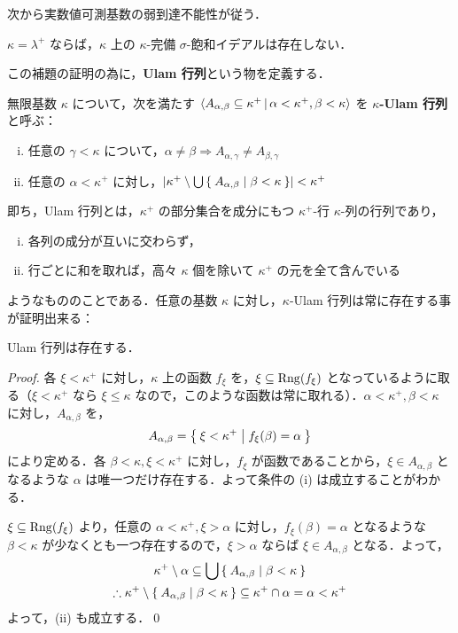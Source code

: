 \documentclass[a4j]{jsarticle}
\begin{document}
次から実数値可測基数の弱到達不能性が従う．

\begin{lemma}
 $\kappa = \lambda^+$ ならば，$\kappa$ 上の $\kappa$-完備 $\sigma$-飽和イデアルは存在しない．
\end{lemma}

この補題の証明の為に，{\bfseries Ulam 行列}という物を定義する．

\begin{definition}[Ulam 行列]
 無限基数 $\kappa$ について，次を満たす $\Braket{A_{\alpha, \beta} \subseteq \kappa^+ | \alpha < \kappa^+, \beta < \kappa }$ を {\bfseries $\kappa$-Ulam 行列} と呼ぶ：
 \begin{enumerate}[(i)]
 \item 任意の $\gamma < \kappa$ について，$\alpha \neq \beta \Rightarrow A_{\alpha,\gamma} \neq A_{\beta, \gamma}$
 \item 任意の $\alpha < \kappa^+$ に対し，$\left|\kappa^+ \setminus \bigcup\Set{A_{\alpha, \beta} | \beta < \kappa}\right| < \kappa^+$
 \end{enumerate}
\end{definition}

即ち，Ulam 行列とは，$\kappa^+$ の部分集合を成分にもつ $\kappa^+$-行 $\kappa$-列の行列であり，
\begin{enumerate}[(i)]
 \item 各列の成分が互いに交わらず，
 \item 行ごとに和を取れば，高々 $\kappa$ 個を除いて $\kappa^+$ の元を全て含んでいる
\end{enumerate}
ようなもののことである．任意の基数 $\kappa$ に対し，$\kappa$-Ulam 行列は常に存在する事が証明出来る：
\begin{lemma}\label{lem:Ulam-matrix-exists}
 Ulam 行列は存在する．
\end{lemma}
\begin{proof}
 各 $\xi < \kappa^+$ に対し，$\kappa$ 上の函数 $f_\xi$ を，$\xi \subseteq \mathrm{Rng}(f_\xi)$ となっているように取る（$\xi < \kappa^+$ なら $\xi \leq \kappa$ なので，このような函数は常に取れる）．$\alpha < \kappa^+, \beta < \kappa$ に対し，$A_{\alpha, \beta}$ を，
 \[
  A_{\alpha, \beta} = \Set{\xi < \kappa^+ | f_\xi(\beta) = \alpha }
 \]
 により定める．各 $\beta < \kappa, \xi < \kappa^+$ に対し，$f_\xi$ が函数であることから，$\xi \in A_{\alpha, \beta}$ となるような $\alpha$ は唯一つだけ存在する．よって条件の (i) は成立することがわかる．

 $\xi \subseteq \mathrm{Rng}(f_\xi)$ より，任意の $\alpha < \kappa^+, \xi > \alpha$ に対し，$f_\xi(\beta) = \alpha$ となるような $\beta < \kappa$ が少なくとも一つ存在するので，$\xi > \alpha$ ならば $\xi \in A_{\alpha, \beta}$ となる．よって，
 \begin{gather*}
  \kappa^+ \setminus \alpha \subseteq \bigcup\Set{ A_{\alpha, \beta} | \beta < \kappa}\\
  \therefore \kappa^+ \setminus \Set{ A_{\alpha, \beta} | \beta < \kappa}
  \subseteq \kappa^+ \cap \alpha = \alpha < \kappa^+
 \end{gather*}
 よって，(ii) も成立する．\qed
\end{proof}
\end{document}
